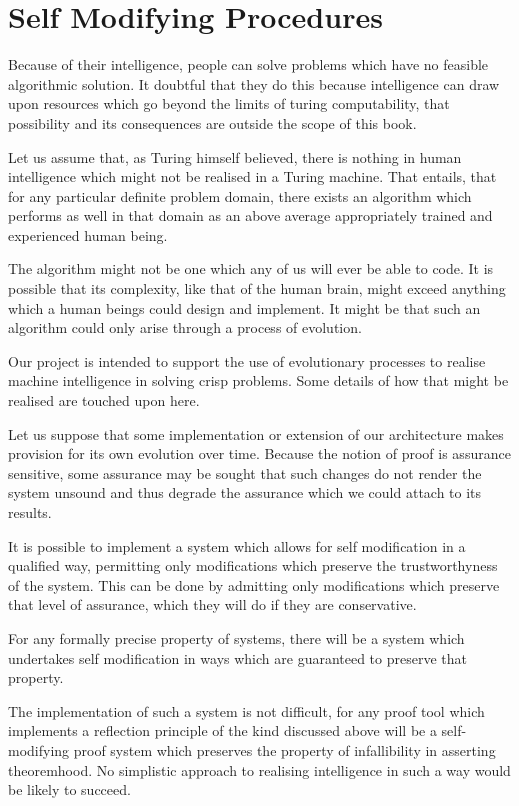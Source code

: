 \section{Self Modifying Procedures}

Because of their intelligence, people can solve problems which have no
feasible algorithmic solution.
It doubtful that they do this because intelligence can draw upon
resources which go beyond the limits of turing computability, that
possibility and its consequences are outside the scope of this book.

Let us assume that, as Turing himself believed, there is nothing in
human intelligence which might not be realised in a Turing machine.
That entails, that for any particular definite problem domain, there
exists an algorithm which performs as well in that domain as
an above average appropriately trained and experienced human being.

The algorithm might not be one which any of us will ever be able to
code.
It is possible that its complexity, like that of the human brain,
might exceed anything which a human beings could design and
implement.
It might be that such an algorithm could only arise through a process
of evolution.

Our project is intended to support the use of evolutionary processes
to realise machine intelligence in solving crisp problems.
Some details of how that might be realised are touched upon here.

Let us suppose that some implementation or extension of our
architecture makes provision for its own evolution over time.
Because the notion of proof is assurance sensitive, some assurance may
be sought that such changes do not render the system unsound and thus
degrade the assurance which we could attach to its results.

It is possible to implement a system which allows for self
modification in a qualified way, permitting only modifications which
preserve the trustworthyness of the system.
This can be done by admitting only modifications which preserve that
level of assurance, which they will do if they are conservative.

For any formally precise property of systems, there will be a system
which undertakes self modification in ways which are guaranteed to
preserve that property.

The implementation of such a system is not difficult, for any proof
tool which implements a reflection principle of the kind discussed
above will be a self-modifying proof system which preserves the
property of infallibility in asserting theoremhood.
No simplistic approach to realising intelligence in such a way would
be likely to succeed.







